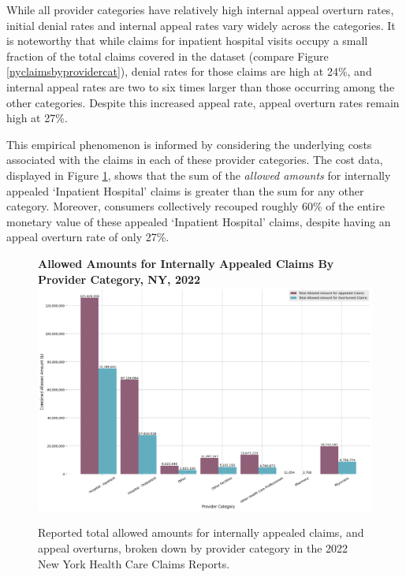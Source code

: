 \documentclass[12pt, a4paper,twoside]{report}
\theoremstyle{plain} %
\theoremstyle{definition} %
\theoremstyle{remark} %
\numberwithin{equation}{chapter}
\begin{document}
		While all provider categories have relatively high internal appeal overturn rates, initial denial rates and internal appeal rates vary widely across the categories. It is noteworthy that while claims for inpatient hospital visits occupy a small fraction of the total claims covered in the dataset (compare Figure \ref{nyclaimsbyprovidercat}), denial rates for those claims are high at 24\%, and internal appeal rates are two to six times larger than those occurring among the other categories. Despite this increased appeal rate, appeal overturn rates remain high at 27\%.
		
		This empirical phenomenon is informed by considering the underlying costs associated with the claims in each of these provider categories. The cost data, displayed in Figure \ref{nyappealsallowedamts}, shows that the sum of the \emph{allowed amounts} for internally appealed `Inpatient Hospital' claims is greater than the sum for any other category. Moreover, consumers collectively recouped roughly 60\% of the entire monetary value of these appealed `Inpatient Hospital' claims, despite having an appeal overturn rate of only 27\%.
		
		\begin{figure}[h!]
			\centering
			\textbf{Allowed Amounts for Internally Appealed Claims By Provider Category, NY, 2022}
			\includegraphics[width=\columnwidth]{images/ny_claim_reports/allowed_amts_by_provider_category_stacked.png}
			\caption{Reported total allowed amounts for internally appealed claims, and appeal overturns, broken down by provider category in the 2022 New York Health Care Claims Reports.}
			\label{nyappealsallowedamts}
		\end{figure}
	
\end{document}
